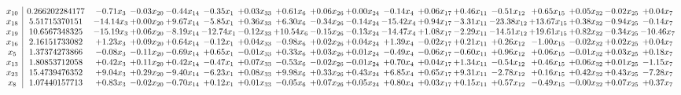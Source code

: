 \documentclass[9pt]{article}
\begin{document}
\[\begin{array}{c| c c@{\hskip 2pt} c@{\hskip 2pt} c@{\hskip 2pt} c@{\hskip 2pt} c@{\hskip 2pt} c@{\hskip 2pt} c@{\hskip 2pt} c@{\hskip 2pt} c@{\hskip 2pt} c@{\hskip 2pt} c@{\hskip 2pt} c@{\hskip 2pt} c@{\hskip 2pt} c@{\hskip 2pt} c@{\hskip 2pt} c@{\hskip 2pt} }
 x_{10}   &  0.266202284177 & -0.71 x_{3} & -0.03 x_{20} & -0.44 x_{14} & -0.35 x_{1} & +  0.03 x_{33} & +  0.61 x_{6} & +  0.06 x_{26} & +  0.00 x_{24} & -0.14 x_{4} & +  0.06 x_{17} & +  0.46 x_{11} & -0.51 x_{12} & +  0.65 x_{15} & +  0.05 x_{32} & -0.02 x_{25} & +  0.04 x_{7}\\
 x_{18}   &  5.51715370151 & -14.14 x_{3} & +  0.00 x_{20} & +  9.67 x_{14} & -5.85 x_{1} & +  0.36 x_{33} & +  6.30 x_{6} & -0.34 x_{26} & -0.14 x_{24} & -15.42 x_{4} & +  0.94 x_{17} & -3.31 x_{11} & -23.38 x_{12} & + 13.67 x_{15} & +  0.38 x_{32} & -0.94 x_{25} & -0.14 x_{7}\\
 x_{19}   &  10.6567348325 & -15.19 x_{3} & +  0.06 x_{20} & -8.19 x_{14} & -12.74 x_{1} & -0.12 x_{33} & + 10.54 x_{6} & -0.15 x_{26} & -0.13 x_{24} & -14.47 x_{4} & +  1.08 x_{17} & -2.29 x_{11} & -14.51 x_{12} & + 19.61 x_{15} & +  0.82 x_{32} & -0.34 x_{25} & -10.46 x_{7}\\
 x_{16}   &  2.16151733082 & +  1.23 x_{3} & +  0.09 x_{20} & +  0.64 x_{14} & -0.12 x_{1} & +  0.04 x_{33} & -0.98 x_{6} & +  0.02 x_{26} & +  0.04 x_{24} & +  1.39 x_{4} & -0.02 x_{17} & +  0.21 x_{11} & +  0.26 x_{12} & -1.00 x_{15} & -0.02 x_{32} & +  0.02 x_{25} & +  0.04 x_{7}\\
 x_{5}   &  1.37374273866 & -0.08 x_{3} & -0.11 x_{20} & -0.69 x_{14} & +  0.65 x_{1} & -0.01 x_{33} & +  0.33 x_{6} & +  0.03 x_{26} & +  0.01 x_{24} & -0.49 x_{4} & -0.06 x_{17} & -0.60 x_{11} & +  0.96 x_{12} & +  0.06 x_{15} & -0.01 x_{32} & +  0.03 x_{25} & +  0.18 x_{7}\\
 x_{13}   &  1.80853712058 & +  0.42 x_{3} & +  0.11 x_{20} & +  0.42 x_{14} & -0.47 x_{1} & +  0.07 x_{33} & -0.53 x_{6} & -0.02 x_{26} & -0.01 x_{24} & +  0.70 x_{4} & +  0.04 x_{17} & +  1.34 x_{11} & -0.54 x_{12} & +  0.46 x_{15} & +  0.06 x_{32} & +  0.01 x_{25} & -1.15 x_{7}\\
 x_{23}   &  15.4739476352 & +  9.04 x_{3} & +  0.29 x_{20} & -9.40 x_{14} & -6.23 x_{1} & +  0.08 x_{33} & +  9.98 x_{6} & +  0.33 x_{26} & +  0.43 x_{24} & +  6.85 x_{4} & +  0.65 x_{17} & +  9.31 x_{11} & -2.78 x_{12} & +  0.16 x_{15} & +  0.42 x_{32} & +  0.43 x_{25} & -7.28 x_{7}\\
 x_{8}   &  1.07440157713 & +  0.83 x_{3} & -0.02 x_{20} & -0.70 x_{14} & +  0.12 x_{1} & +  0.01 x_{33} & -0.05 x_{6} & +  0.07 x_{26} & +  0.05 x_{24} & +  0.80 x_{4} & +  0.03 x_{17} & +  0.15 x_{11} & +  0.57 x_{12} & -0.49 x_{15} & -0.00 x_{32} & +  0.07 x_{25} & +  0.37 x_{7}\\

\end{array}\]
\end{document}
